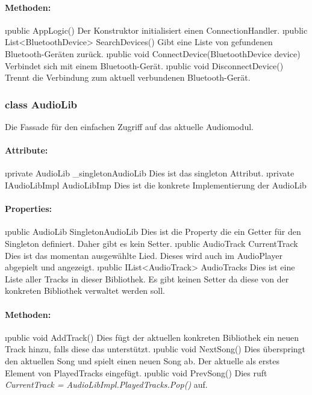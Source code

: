 \documentclass[../entwurf.tex]{subfiles}
\begin{document}
				\paragraph{Methoden:}
					\begin{itemize}
						\i{public AppLogic()} Der Konstruktor initialisiert einen ConnectionHandler.
						\i{public List<BluetoothDevice> SearchDevices()} Gibt eine Liste von gefundenen Bluetooth-Geräten zurück.
						\i{public void ConnectDevice(BluetoothDevice device)} Verbindet sich mit einem Bluetooth-Gerät.
						\i{public void DisconnectDevice()} Trennt die Verbindung zum aktuell verbundenen Bluetooth-Gerät.
					\end{itemize}
			\subsubsection{class AudioLib}
				Die Fassade für den einfachen Zugriff auf das aktuelle Audiomodul.
				\paragraph{Attribute:}
					\begin{itemize}
						\i{private AudioLib \_singletonAudioLib} Dies ist das singleton Attribut.
						\i{private IAudioLibImpl AudioLibImp} Dies ist die konkrete Implementierung der
						AudioLib
					\end{itemize}
				\paragraph{Properties:}
					\begin{itemize}
						\i{public AudioLib SingletonAudioLib} Dies ist die Property die ein Getter für den
						Singleton definiert. Daher gibt es kein Setter.
						\i{public AudioTrack CurrentTrack} Dies ist das momentan ausgewählte Lied. Dieses
						wird auch im AudioPlayer abgepielt und angezeigt.
						\i{public IList<AudioTrack> AudioTracks} Dies ist eine Liste aller Tracks in dieser
						Bibliothek. Es gibt keinen Setter da diese von der konkreten Bibliothek verwaltet werden soll.
					\end{itemize}
				\paragraph{Methoden:}
					\begin{itemize}
						\i{public void AddTrack()} Dies fügt der aktuellen konkreten Bibliothek ein neuen Track hinzu,
						falls diese das unterstützt.
						\i{public void NextSong()} Dies überspringt den aktuellen Song und spielt einen neuen Song ab.
						Der aktuelle als erstes Element von PlayedTracks eingefügt.
						\i{public void PrevSong()} Dies ruft \textit{CurrentTrack = AudioLibImpl.PlayedTracks.Pop()} auf.
					\end{itemize}
\end{document}
